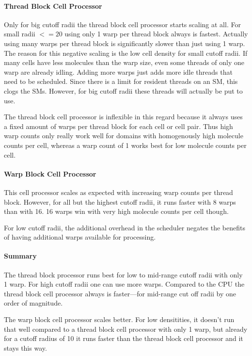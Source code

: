 \paragraph{Thread Block Cell Processor}
Only for big cutoff radii the thread block cell processor starts scaling at all. For small radii $<= 20$ using only 1 warp per thread block always is fastest. Actually using many warps per thread block is significantly slower than just using 1 warp. The reason for this negative scaling is the low cell density for small cutoff radii. If many cells have less molecules than the warp size, even some threads of only one warp are already idling. Adding more warps just adds more idle threads that need to be scheduled. Since there is a limit for resident threads on an SM, this clogs the SMs.
However, for big cutoff radii these threads will actually be put to use.

The thread block cell processor is inflexible in this regard because it always uses a fixed amount of warps per thread block for each cell or cell pair. Thus high warp counts only really work well for domains with homogenously high molecule counts per cell, whereas a warp count of 1 works best for low molecule counts per cell.

\paragraph{Warp Block Cell Processor}
This cell processor scales as expected with increasing warp counts per thread block. However, for all but the highest cutoff radii, it runs faster with 8 warps than with 16. 16 warps win with very high molecule counts per cell though.

For low cutoff radii, the additional overhead in the scheduler negates the benefits of having additional warps available for processing.

\paragraph{Summary}
The thread block processor runs best for low to mid-range cutoff radii with only 1 warp. For high cutoff radii one can use more warps.
Compared to the CPU the thread block cell processor always is faster---for mid-range cut off radii by one order of magnitude.

The warp block cell processor scales better. For low densitities, it doesn't run that well compared to a thread block cell processor with only 1 warp, but already for a cutoff radius of 10 it runs faster than the thread block cell processor and it stays this way.

